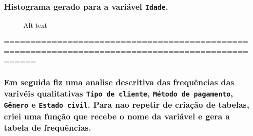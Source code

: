 \documentclass[
]{article}
\makeatletter
\newenvironment{Shaded}{\begin{snugshade}}{\end{snugshade}}
\newcommand{\AttributeTok}[1]{\textcolor[rgb]{0.13,0.29,0.53}{#1}}
\newcommand{\CommentTok}[1]{\textcolor[rgb]{0.56,0.35,0.01}{\textit{#1}}}
\newcommand{\FunctionTok}[1]{\textcolor[rgb]{0.13,0.29,0.53}{\textbf{#1}}}
\newcommand{\NormalTok}[1]{#1}
\newcommand{\SpecialCharTok}[1]{\textcolor[rgb]{0.81,0.36,0.00}{\textbf{#1}}}
\newcommand{\StringTok}[1]{\textcolor[rgb]{0.31,0.60,0.02}{#1}}
\newcommand*\pandocbounded[1]{%
  \sbox\pandoc@box{#1}%
  \Gscale@div\@tempa{\textheight}{\dimexpr\ht\pandoc@box+\dp\pandoc@box\relax}%
  \Gscale@div\@tempb{\linewidth}{\wd\pandoc@box}%
  \ifdim\@tempb\p@<\@tempa\p@\let\@tempa\@tempb\fi%
  \ifdim\@tempa\p@<\p@\scalebox{\@tempa}{\usebox\pandoc@box}%
  \else\usebox{\pandoc@box}%
  \fi%
}
\makeatother
\begin{document}
\subsubsection{\texorpdfstring{Histograma gerado para a variável
\texttt{Idade}.}{Histograma gerado para a variável Idade.}}\label{histograma-gerado-para-a-variuxe1vel-idade.}

\begin{Shaded}
\end{Shaded}

\begin{figure}
\centering
\pandocbounded{\texttt{[image: 1.png]}}
\caption{Alt text}
\end{figure}

==================================================================================================

\subsubsection{\texorpdfstring{Em seguida fiz uma analise descritiva das
frequências das varivéis qualitativas \texttt{Tipo\ de\ cliente},
\texttt{Método\ de\ pagamento}, \texttt{Gênero} e
\texttt{Estado\ civil}. Para nao repetir de criação de tabelas, criei
uma função que recebe o nome da variável e gera a tabela de
frequências.}{Em seguida fiz uma analise descritiva das frequências das varivéis qualitativas Tipo de cliente, Método de pagamento, Gênero e Estado civil. Para nao repetir de criação de tabelas, criei uma função que recebe o nome da variável e gera a tabela de frequências.}}\label{em-seguida-fiz-uma-analise-descritiva-das-frequuxeancias-das-varivuxe9is-qualitativas-tipo-de-cliente-muxe9todo-de-pagamento-guxeanero-e-estado-civil.-para-nao-repetir-de-criauxe7uxe3o-de-tabelas-criei-uma-funuxe7uxe3o-que-recebe-o-nome-da-variuxe1vel-e-gera-a-tabela-de-frequuxeancias.}
\end{document}
